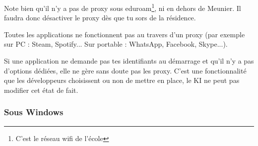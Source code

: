 \documentclass{../templates/enpc-ki/ki019}
\begin{document}
    Note bien qu'il n'y a pas de proxy sous eduroam\footnote{C'est le réseau wifi de l'école}, ni en dehors de Meunier. Il faudra donc désactiver le proxy dès que tu sors de la résidence.

    \begin{kiframe}
      Toutes les applications ne fonctionnent pas au travers d'un proxy (par exemple sur PC : Steam, Spotify... Sur portable : WhatsApp, Facebook, Skype...).

      Si une application ne demande pas tes identifiants au démarrage et qu'il n'y a pas d'options dédiées, elle ne gère sans doute pas les proxy. C'est une fonctionnalité que les développeurs choisissent ou non de mettre en place, le KI ne peut pas modifier cet état de fait.
    \end{kiframe}

\newpage
      \subsubsection{Sous Windows}
\end{document}
